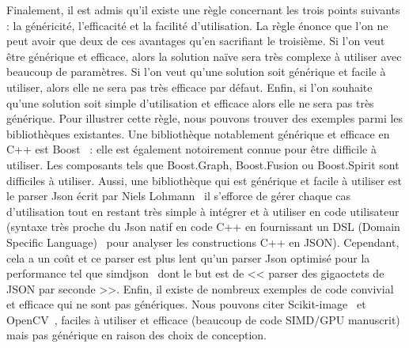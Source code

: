 Finalement, il est admis qu'il existe une règle concernant les trois points suivants : la généricité, l'efficacité et la
facilité d'utilisation. La règle énonce que l'on ne peut avoir que deux de ces avantages qu'en sacrifiant le troisième.
Si l'on veut être générique et efficace, alors la solution naïve sera très complexe à utiliser avec beaucoup de
paramètres. Si l'on veut qu'une solution soit générique et facile à utiliser, alors elle ne sera pas très efficace par
défaut. Enfin, si l'on souhaite qu'une solution soit simple d'utilisation et efficace alors elle ne sera pas très
générique. Pour illustrer cette règle, nous pouvons trouver des exemples parmi les bibliothèques existantes. Une
bibliothèque notablement générique et efficace en C++ est Boost~\parencite{boost.2021} : elle est également notoirement
connue pour être difficile à utiliser. Les composants tels que Boost.Graph, Boost.Fusion ou Boost.Spirit sont difficiles
à utiliser. Aussi, une bibliothèque qui est générique et facile à utiliser est le parser Json écrit par Niels
Lohmann~\parencite{nlohmann.2021.json} il s'efforce de gérer chaque cas d'utilisation tout en restant très simple à
intégrer et à utiliser en code utilisateur (syntaxe très proche du Json natif en code C++ en fournissant un DSL (Domain
Specific Language)~\parencite{deursen.2000.DSL} pour analyser les constructions C++ en JSON). Cependant, cela a un coût
et ce parser est plus lent qu'un parser Json optimisé pour la performance tel que
simdjson~\parencite{lemire.2021.simdjson} dont le but est de << parser des gigaoctets de JSON par seconde >>. Enfin, il
existe de nombreux exemples de code convivial et efficace qui ne sont pas génériques. Nous pouvons citer
Scikit-image~\parencite{vanderwalt.2014.skimage} et OpenCV~\parencite{bradski.2000.opencv}, faciles à utiliser et
efficace (beaucoup de code SIMD/GPU manuscrit) mais pas générique en raison des choix de conception.

